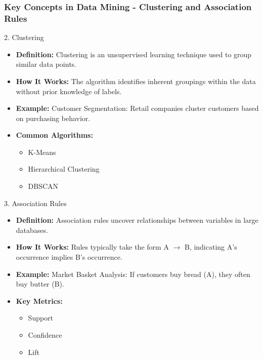 \documentclass[aspectratio=169]{beamer}
\begin{document}
\begin{frame}[fragile]
    \frametitle{Key Concepts in Data Mining - Clustering and Association Rules}
    \begin{block}{2. Clustering}
        \begin{itemize}
            \item \textbf{Definition:} Clustering is an unsupervised learning technique used to group similar data points.
            \item \textbf{How It Works:} The algorithm identifies inherent groupings within the data without prior knowledge of labels.
            \item \textbf{Example:} Customer Segmentation: Retail companies cluster customers based on purchasing behavior.
            \item \textbf{Common Algorithms:}
            \begin{itemize}
                \item K-Means
                \item Hierarchical Clustering
                \item DBSCAN 
            \end{itemize}
        \end{itemize}
    \end{block}
    
    \begin{block}{3. Association Rules}
        \begin{itemize}
            \item \textbf{Definition:} Association rules uncover relationships between variables in large databases.
            \item \textbf{How It Works:} Rules typically take the form A $\rightarrow$ B, indicating A's occurrence implies B's occurrence.
            \item \textbf{Example:} Market Basket Analysis: If customers buy bread (A), they often buy butter (B).
            \item \textbf{Key Metrics:}
            \begin{itemize}
                \item Support
                \item Confidence
                \item Lift
            \end{itemize}
        \end{itemize}
    \end{block}
\end{frame}
\end{document}
